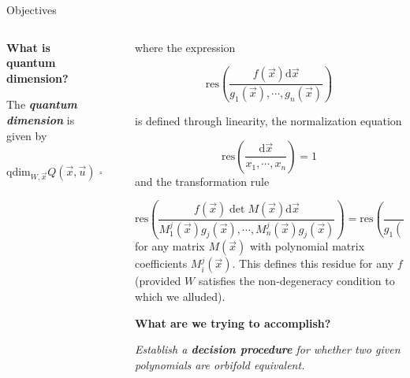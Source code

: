 \documentclass[final]{beamer}
\newlength{\sepwid}
\newlength{\onecolwid}
\newlength{\smallercolwid}
\begin{document}
\begin{frame}[t]
\begin{alertblock}{Objectives}
\begin{columns}
\begin{column}{\smallercolwid}
\textbf{\large{}What is quantum dimension?}{\large \par}

The \textbf{\emph{quantum dimension }}is given by

\[
\mathrm{qdim}_{W,\vec{x}}Q(\vec{x},\vec{u})=\pm\mathrm{res}\left(\frac{\mathrm{str}(\partial_{x_{1}}Q\cdots\partial_{x_{n}}Q\partial_{u_{1}}Q\cdots\partial_{u_{m}}Q)\mathrm{d}\vec{x}}{\partial_{x_{1}}W,\cdots,\partial_{x_{n}}W}\right)
\]

\end{column} %
\begin{column}{\sepwid}\end{column} %
\begin{column}{\onecolwid} %

where the expression

\[
\mathrm{res}\left(\frac{f(\vec{x})\mathrm{d}\vec{x}}{g_{1}(\vec{x}),\cdots,g_{n}(\vec{x})}\right)
\]

is defined through linearity, the normalization equation

\[
\mathrm{res}\left(\frac{\mathrm{d}\vec{x}}{x_{1},\cdots,x_{n}}\right)=1
\]
and the transformation rule

\[
\mathrm{res}\left(\frac{f(\vec{x})\det M(\vec{x})\mathrm{d}\vec{x}}{M_{1}^{j}(\vec{x})g_{j}(\vec{x}),\cdots,M_{n}^{j}(\vec{x})g_{j}(\vec{x})}\right)=\mathrm{res}\left(\frac{f(\vec{x})\mathrm{d}\vec{x}}{g_{1}(\vec{x}),\cdots,g_{n}(\vec{x})}\right)
\]
for any matrix $M(\vec{x})$ with polynomial matrix coefficients $M_i^j(\vec{x})$. This defines this residue for any $f$ (provided $W$ satisfies the
non-degeneracy condition to which we alluded).

\bigskip

\textbf{\large{}What are we trying to accomplish?}{\large \par}

\emph{Establish a {\bf decision procedure} for whether two given polynomials
are orbifold equivalent.}

\end{column}
\end{columns}

\end{alertblock}

\begin{columns}[t] %

\begin{column}{\sepwid}\end{column} %


\end{columns}
\end{frame}
\end{document}
